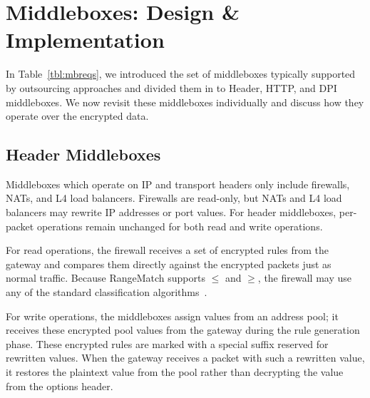 \section{Middleboxes: Design \& Implementation}
\label{sec:mbs}

In Table~\ref{tbl:mbreqs}, we introduced the set of middleboxes typically supported by outsourcing approaches and divided them in to Header, HTTP, and DPI middleboxes. 
We now revisit these middleboxes individually and discuss how they operate over the encrypted data.


\subsection{Header Middleboxes}
Middleboxes which operate on IP and transport headers only include firewalls, NATs, and L4 load balancers.
Firewalls are read-only, but NATs and L4 load balancers may rewrite IP addresses or port values. 
For header middleboxes, per-packet operations remain unchanged for both read and write operations.

For read operations, the firewall receives a set of encrypted rules from the gateway and compares them directly against the encrypted packets just as normal traffic. Because RangeMatch supports $\leq$ and $\geq$, the firewall may use any of the standard classification algorithms~\cite{packet_classif}.

For write operations, the middleboxes assign values from an address pool; it receives these encrypted pool values from the gateway during the rule generation phase.
These encrypted rules are marked with a special suffix reserved for rewritten values.
When the gateway receives a packet with such a rewritten value, it restores the plaintext value from the pool rather than decrypting the value from the options header.

